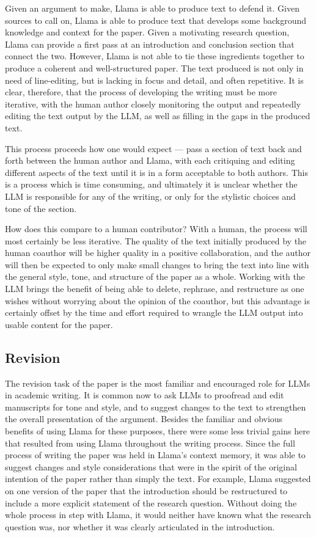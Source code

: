 Given an argument to make, Llama is able to produce text to defend it. Given 
sources to call on, Llama is able to produce text that develops some background
knowledge and context for the paper. Given a motivating research question, Llama
can provide a first pass at an introduction and conclusion section that connect
the two. However, Llama is not able to tie these ingredients together to produce
a coherent and well-structured paper. The text produced is not only in need of
line-editing, but is lacking in focus and detail, and often repetitive. It is
clear, therefore, that the process of developing the writing must be more
iterative, with the human author closely monitoring the output and repeatedly 
editing the text output by the LLM, as well as filling in the gaps in the 
produced text. 

This process proceeds how one would expect — pass a section of text back and
forth between the human author and Llama, with each critiquing and editing
different aspects of the text until it is in a form acceptable to both authors.
This is a process which is time consuming, and ultimately it is unclear whether
the LLM is responsible for any of the writing, or only for the stylistic choices
and tone of the section. 

How does this compare to a human contributor? With a human, the process will 
most certainly be less iterative. The quality of the text initially produced by
the human coauthor will be higher quality in a positive collaboration, and the
author will then be expected to only make small changes to bring the text into
line with the general style, tone, and structure of the paper as a whole.
Working with the LLM brings the benefit of being able to delete, rephrase, and 
restructure as one wishes without worrying about the opinion of the coauthor,
but this advantage is certainly offset by the time and effort required to 
wrangle the LLM output into usable content for the paper.

\subsection{Revision}

The revision task of the paper is the most familiar and encouraged role for
LLMs in academic writing. It is common now to ask LLMs to proofread and edit
manuscripts for tone and style, and to suggest changes to the text to strengthen
the overall presentation of the argument. Besides the familiar and obvious
benefits of using Llama for these purposes, there were some less trivial gains
here that resulted from using Llama throughout the writing process. Since
the full process of writing the paper was held in Llama's context memory, it was
able to suggest changes and style considerations that were in the spirit of the
original intention of the paper rather than simply the text. For example, Llama 
suggested on one version of the paper that the introduction should be
restructured to include a more explicit statement of the research question.
Without doing the whole process in step with Llama, it would neither have known
what the research question was, nor whether it was clearly articulated in the
introduction.


